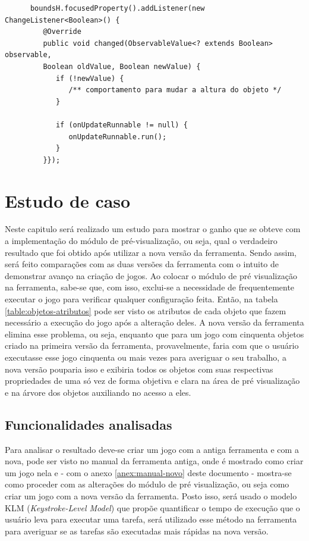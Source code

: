 \documentclass[12pt,oneside,openright,a4paper,english,brazil,sumario=tradicional]{abntex2}
\begin{document}
\begin{mylisting}[t]
   \begin{lstlisting}
      boundsH.focusedProperty().addListener(new ChangeListener<Boolean>() {
         @Override
         public void changed(ObservableValue<? extends Boolean> observable,
         Boolean oldValue, Boolean newValue) {
            if (!newValue) {
               /** comportamento para mudar a altura do objeto */
            }

            if (onUpdateRunnable != null) {
               onUpdateRunnable.run();
            }
         }});
   \end{lstlisting}
\end{mylisting}


\label{chap:caso}
\chapter{Estudo de caso}

Neste capitulo será realizado um estudo para mostrar o ganho que se obteve com a implementação do módulo de pré-visualização, ou seja, qual o verdadeiro resultado que foi obtido após utilizar a nova versão da ferramenta. Sendo assim, será feito comparações com as duas versões da ferramenta com o intuito de demonstrar avanço na criação de jogos. Ao colocar o módulo de pré visualização na ferramenta, sabe-se que, com isso, exclui-se a necessidade de frequentemente executar o jogo para verificar qualquer configuração feita. Então, na tabela \ref{table:objetos-atributos} pode ser visto os atributos de cada objeto que fazem necessário a execução do jogo após a alteração deles. A nova versão da ferramenta elimina esse problema, ou seja, enquanto que para um jogo com cinquenta objetos criado na primeira versão da ferramenta, provavelmente, faria com que o usuário executasse esse jogo cinquenta ou mais vezes para averiguar o seu trabalho, a nova versão pouparia isso e exibiria todos os objetos com suas respectivas propriedades de uma só vez de forma objetiva e clara na área de pré visualização e na árvore dos objetos auxiliando no acesso a eles.

\section{Funcionalidades analisadas}

Para analisar o resultado deve-se criar um jogo com a antiga ferramenta e com a nova, pode ser visto no manual da ferramenta antiga, onde é mostrado como criar um jogo nela \cite{monografia:aquino} e - com o anexo \ref{anex:manual-novo} deste documento - mostra-se como proceder com as alterações do módulo de pré visualização, ou seja como criar um jogo com a nova versão da ferramenta. Posto isso, será usado o modelo KLM (\emph{Keystroke-Level Model}) que propõe quantificar o tempo de execução que o usuário leva para executar uma tarefa, será utilizado esse método na ferramenta para averiguar se as tarefas são executadas mais rápidas na nova versão.
\end{document}
